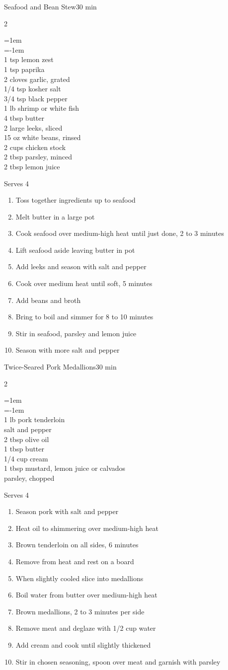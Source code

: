 \documentclass{article}
\newenvironment{recipe}[3][]
    {\begin{cardbase}[#1]{#2}{#3}
    \columnratio{0.333}
    \begin{paracol}{2}}
    {\end{paracol}\end{cardbase}}
\newenvironment{denserecipe}[3][]
    {\small
    \begin{recipe}[#1]{#2}{#3}}
    {\end{recipe}}
\newcommand{\nextcolumn}{\switchcolumn}
\newenvironment{ingredients}
    {
    \begin{obeylines}
    \vspace{\parskip}
    \setlength{\parskip}{0.25em}
    \vspace{-0.25em}
    \leftskip=1em
    \parindent=-1em}
    {\end{obeylines}}
\newenvironment{steps}
    {\begin{enumerate}[leftmargin=*,topsep=0pt]}
    {\end{enumerate}}
\newcommand{\tag}[1]{\hspace{1em}#1}
\newcommand{\symboltag}[2]{\tag{#1\hspace{0.4em}#2}}
\newcommand{\totaltime}[1]{\symboltag{\raisebox{-0.1em}{\small\StopWatchEnd}}{#1}}
\begin{document}
\begin{denserecipe}{Seafood and Bean Stew}{\totaltime{30 min}}
\begin{ingredients}
1 tsp lemon zest
1 tsp paprika
2 cloves garlic, grated
1/4 tsp kosher salt
3/4 tsp black pepper
1 lb shrimp or white fish
4 tbsp butter
2 large leeks, sliced
15 oz white beans, rinsed
2 cups chicken stock
2 tbsp parsley, minced
2 tbsp lemon juice
\end{ingredients}
\nextcolumn
Serves 4
\begin{steps}
    \item Toss together ingredients up to seafood
    \item Melt butter in a large pot
    \item Cook seafood over medium-high heat until just done, 2 to 3 minutes
    \item Lift seafood aside leaving butter in pot
    \item Add leeks and season with salt and pepper
    \item Cook over medium heat until soft, 5 minutes
    \item Add beans and broth
    \item Bring to boil and simmer for 8 to 10 minutes
    \item Stir in seafood, parsley and lemon juice
    \item Season with more salt and pepper
\end{steps}
\end{denserecipe}

\begin{denserecipe}{Twice-Seared Pork Medallions}{\totaltime{30 min}}
\begin{ingredients}
1 lb pork tenderloin
salt and pepper
2 tbsp olive oil
1 tbsp butter
1/4 cup cream
1 tbsp mustard, lemon juice or calvados
parsley, chopped
\end{ingredients}
\nextcolumn
Serves 4
\begin{steps}
    \item Season pork with salt and pepper
    \item Heat oil to shimmering over medium-high heat
    \item Brown tenderloin on all sides, 6 minutes
    \item Remove from heat and rest on a board
    \item When slightly cooled slice into medallions
    \item Boil water from butter over medium-high heat
    \item Brown medallions, 2 to 3 minutes per side
    \item Remove meat and deglaze with 1/2 cup water
    \item Add cream and cook until slightly thickened
    \item Stir in chosen seasoning, spoon over meat and garnish with parsley
\end{steps}
\end{denserecipe}
\end{document}
